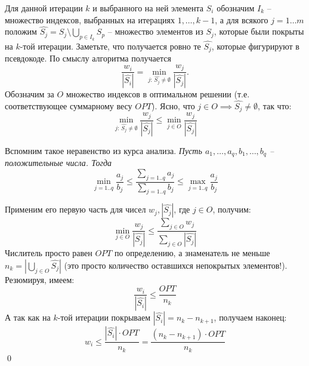 Для данной итерации $k$ и выбранного на ней элемента $S_i$ обозначим $I_k$ -- множество индексов, выбранных на итерациях $1, \ldots, k-1$, а для всякого $j=1\ldots m$ положим $\hat{S_j} = S_j \setminus \bigcup_{p \in I_k}S_p$ -- множество элементов из $S_j$, которые были покрыты на $k$-той итерации. Заметьте, что получается ровно те $\hat{S_j}$, которые фигурируют в псевдокоде. По смыслу алгоритма получается $$\frac{w_i}{|\hat{S_i}|} = \min_{j:\, \hat{S_j}\neq \emptyset} \frac{w_j}{|\hat{S_j}|}.$$
Обозначим за $O$ множество индексов в оптимальном решении (т.е. соответствующее суммарному весу $OPT$). Ясно, что $j \in O \implies \hat{S_j} \neq \emptyset$, так что: $$\min_{j:\, \hat{S_j}\neq \emptyset} \frac{w_j}{|\hat{S_j}|} \leq \min_{j \in O} \frac{w_j}{|\hat{S_j}|}$$

Вспомним такое неравенство из курса анализа. \textit{Пусть $a_1, \ldots, a_q, b_1, \ldots, b_q$ -- положительные числа. Тогда}
$$\min_{j=1..q} \frac{a_j}{b_j} \leq \frac{\sum\limits_{j=1..q} a_j}{\sum\limits_{j=1..q} b_j} \leq \max_{j=1..q} \frac{a_j}{b_j}$$

Применим его первую часть для чисел $w_j, |\hat{S_j}|$, где $j \in O$, получим:
$$\min_{j\in O} \frac{w_j}{\left|\hat{S_j}\right|} \leq \frac{\sum\limits_{j \in O} w_j}{\sum\limits_{j \in O} |\hat{S_j}|}$$
Числитель просто равен $OPT$ по определению, а знаменатель не меньше $n_k = |\bigcup_{j \in O} \hat{S_j}|$ (это просто количество оставшихся непокрытых элементов!). Резюмируя, имеем: $$\frac{w_i}{|\hat{S_i}|} \leq \frac{OPT}{n_k}$$
А так как на $k$-той итерации покрываем $|\hat{S_i}| = n_k - n_{k+1}$, получаем наконец:
$$w_i \leq \frac{|\hat{S_i}|\cdot OPT}{n_k} = \frac{(n_k-n_{k+1})\cdot OPT}{n_k}$$\qed
